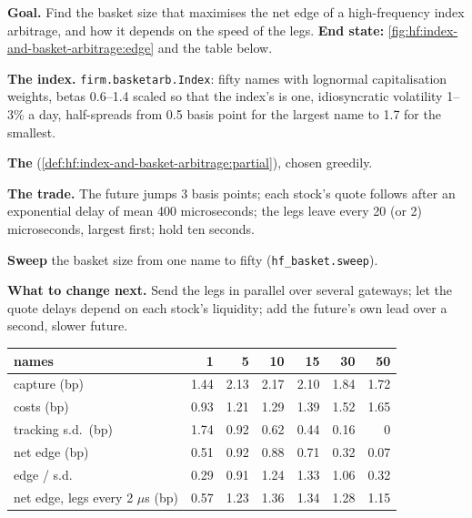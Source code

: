 \begin{tutorial}
\textbf{Goal.} Find the basket size that maximises the net edge of a high-frequency index arbitrage, and how it depends on the speed of the
legs. \textbf{End state:} \cref{fig:hf:index-and-basket-arbitrage:edge} and the table below.
\begin{tutsteps}
\item \textbf{The index.} \texttt{firm.basketarb.Index}: fifty names with lognormal capitalisation weights, betas 0.6--1.4 scaled so that the
index's is one, idiosyncratic volatility 1--3\% a day, half-spreads from 0.5 basis point for the largest name to 1.7 for the smallest.
\item \textbf{The } (\cref{def:hf:index-and-basket-arbitrage:partial}), chosen greedily.
\label{lst:hf:index-and-basket-arbitrage:partial}
\item \textbf{The trade.} The future jumps 3 basis points; each stock's quote follows after an exponential delay of mean 400 microseconds; the
legs leave every 20 (or 2) microseconds, largest first; hold ten seconds.
\label{lst:hf:index-and-basket-arbitrage:trade}
\item \textbf{Sweep} the basket size from one name to fifty (\texttt{hf\_basket.sweep}).
\end{tutsteps}
\textbf{What to change next.} Send the legs in parallel over several gateways; let the quote delays depend on each stock's liquidity; add the
future's own lead over a second, slower future.
\end{tutorial}

\begin{center}
\small
\begin{tabular}{@{}lrrrrrr@{}}
\toprule
names & 1 & 5 & 10 & 15 & 30 & 50\\
\midrule
capture (bp) & 1.44 & 2.13 & 2.17 & 2.10 & 1.84 & 1.72\\
costs (bp) & 0.93 & 1.21 & 1.29 & 1.39 & 1.52 & 1.65\\
tracking s.d.\ (bp) & 1.74 & 0.92 & 0.62 & 0.44 & 0.16 & 0\\
net edge (bp) & 0.51 & 0.92 & 0.88 & 0.71 & 0.32 & 0.07\\
edge / s.d. & 0.29 & 0.91 & 1.24 & 1.33 & 1.06 & 0.32\\
net edge, legs every 2 $\mu$s (bp) & 0.57 & 1.23 & 1.36 & 1.34 & 1.28 & 1.15\\
\bottomrule
\end{tabular}
\end{center}

